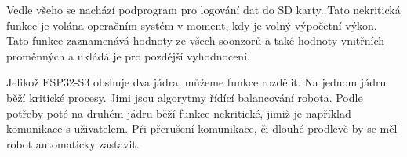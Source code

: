 Vedle všeho se nachází podprogram pro logování dat do SD karty. Tato nekritická funkce je volána operačním systém v moment, kdy je volný výpočetní výkon. Tato funkce zaznamenává hodnoty ze všech soonzorů a také hodnoty vnitřních proměnných a ukládá je pro pozdější vyhodnocení.
\newline

Jelikož ESP32-S3 obshuje dva jádra, můžeme funkce rozdělit. Na jednom jádru běží kritické procesy. Jimi jsou algorytmy řídící balancování robota. Podle potřeby poté na druhém jádru běží funkce nekritické, jimiž je například komunikace s uživatelem. Při přerušení komunikace, či dlouhé prodlevě by se měl robot automaticky zastavit.


